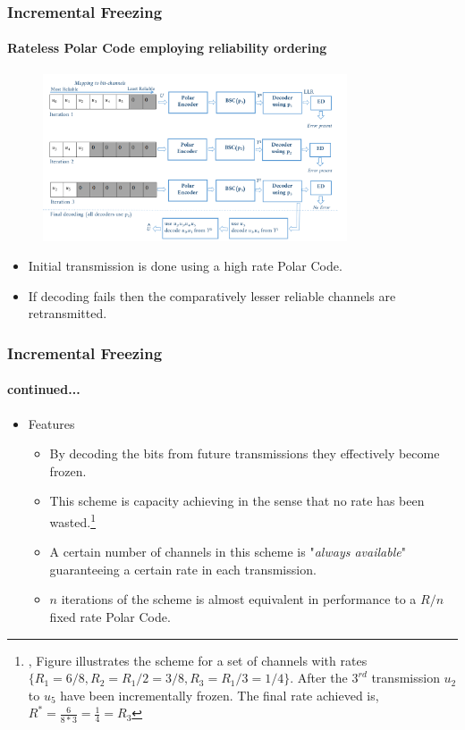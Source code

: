 \documentclass[xcolor=dvipsnames]{beamer}
\begin{document}
\begin{frame}[label = incfrz]
\frametitle{Incremental Freezing}
\framesubtitle{Rateless Polar Code employing reliability ordering}
\begin{figure}
\centering
\includegraphics[width=9cm]{./ifp.png}
\end{figure}
\begin{itemize}
\item Initial transmission is done using a high rate Polar Code.
\item If decoding fails then the comparatively lesser reliable channels are retransmitted.  
\end{itemize}
\end{frame}
\begin{frame}[label = incfrz2]
\frametitle{Incremental Freezing}
\framesubtitle{continued...}
\begin{itemize}
\item Features
\begin{itemize}
\item By decoding the bits from future transmissions they effectively become frozen.
\item This scheme is capacity achieving in the sense that no rate has been wasted.\footnote{\tiny, Figure illustrates the scheme for a set of channels with rates $\{ R_1=6/8, R_2= R_1/2=3/8,R_3= R_1/3=1/4\}$. After the $3^{rd}$ transmission  $u_2$ to $u_{5}$ have been incrementally frozen. The final rate achieved is, $R^*= \frac{6}{8*3}=\frac{1}{4}=R_3 $}
\item A certain number of channels in this scheme is "\emph{always available}" guaranteeing a certain rate in each transmission. 
\item $n$ iterations of the scheme is almost equivalent in performance to a $R/n$ fixed rate Polar Code.
\end{itemize}
\end{itemize}
\end{frame}
\end{document}
